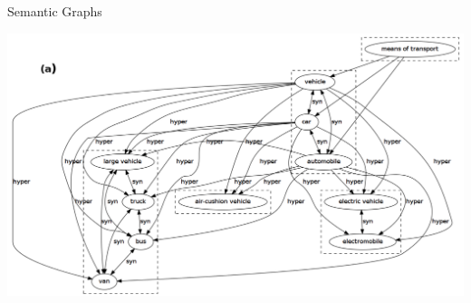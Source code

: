 \begin{frame}{Semantic Graphs}
	
	\begin{center}
  	\includegraphics[width=.99\textwidth]{figures/graph2}
  \end{center}	
\end{frame}


